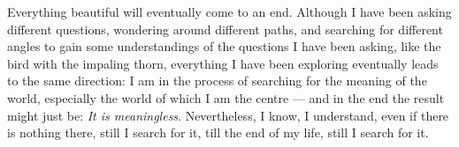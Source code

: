 \begin{center}
\vspace{-0.7em}
\vspace{-0.3em}
\end{center}

Everything beautiful will eventually come to an end. Although I have been asking different questions, wondering around different paths, and searching for different angles to gain some understandings of the questions I have been asking, like the bird with the impaling thorn, everything I have been exploring eventually leads to the same direction: I am in the process of searching for the meaning of the world, especially the world of which I am the centre --- and in the end the result might just be: \emph{It is meaningless}. Nevertheless, I know, I understand, even if there is nothing there, still I search for it, till the end of my life, still I search for it.